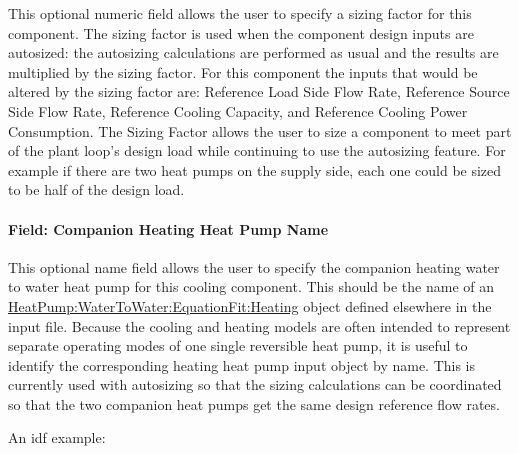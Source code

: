This optional numeric field allows the user to specify a sizing factor for this component. The
sizing factor is used when the component design inputs are autosized: the autosizing calculations
are performed as usual and the results are multiplied by the sizing factor. For this component
the inputs that would be altered by the sizing factor are: Reference Load Side Flow Rate, Reference Source Side Flow Rate, Reference Cooling Capacity, and Reference Cooling Power Consumption. The Sizing Factor allows the user to size
a component to meet part of the plant loop's design load while continuing to use the autosizing feature. For example if there are two heat pumps on the supply side, each one could be sized to be half of the design load.

\paragraph{Field: Companion Heating Heat Pump Name}\label{field-heating-companion-name}

This optional name field allows the user to specify the companion heating water to water heat pump for this cooling component. This should be the name of an \hyperref[heatpumpwatertowaterequationfitheating]{HeatPump:WaterToWater:EquationFit:Heating} object defined elsewhere in the input file. Because the cooling and heating models are often intended to represent separate operating modes of one single reversible heat pump, it is useful to identify the corresponding heating heat pump input object by name. This is currently used with autosizing so that the sizing calculations can be coordinated so that the two companion heat pumps get the same design reference flow rates.

An idf example:

